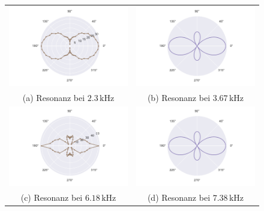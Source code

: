 \begin{figure}
  \centering
  \begin{tabular}{cc}
    \includegraphics[width=65mm]{Daten/Wasserstoff/peak0.pdf} &   \includegraphics[width=65mm]{Daten/Wasserstoff/peakLeg1.pdf} \\
  (a) Resonanz bei $2.3 \,\si{\kilo\hertz} $& (b) Resonanz bei $3.67 \,\si{\kilo\hertz}$ \\[6pt]
  \includegraphics[width=65mm]{Daten/Wasserstoff/peak1.pdf} &   \includegraphics[width=65mm]{Daten/Wasserstoff/peakLeg1.pdf} \\
  (c) Resonanz bei $6.18 \,\si{\kilo\hertz}$ & (d) Resonanz bei $7.38 \,\si{\kilo\hertz}$ \\[6pt]

\end{tabular}
\end{figure}
